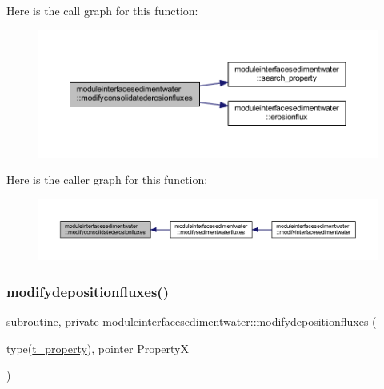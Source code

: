 Here is the call graph for this function\+:\nopagebreak
\begin{figure}[H]
\begin{center}
\leavevmode
\includegraphics[width=350pt]{namespacemoduleinterfacesedimentwater_a15dcf3dbb1639d562e8cfd2115b95c41_cgraph}
\end{center}
\end{figure}
Here is the caller graph for this function\+:\nopagebreak
\begin{figure}[H]
\begin{center}
\leavevmode
\includegraphics[width=350pt]{namespacemoduleinterfacesedimentwater_a15dcf3dbb1639d562e8cfd2115b95c41_icgraph}
\end{center}
\end{figure}
\mbox{\label{namespacemoduleinterfacesedimentwater_a5d9003ebb144c9e66fe6235c416ea685}} 
\subsubsection{\texorpdfstring{modifydepositionfluxes()}{modifydepositionfluxes()}}
{\footnotesize\ttfamily subroutine, private moduleinterfacesedimentwater\+::modifydepositionfluxes (\begin{DoxyParamCaption}\item[{type(\mbox{\hyperlink{structmoduleinterfacesedimentwater_1_1t__property}{t\+\_\+property}}), pointer}]{PropertyX }\end{DoxyParamCaption})\hspace{0.3cm}{\ttfamily [private]}}

